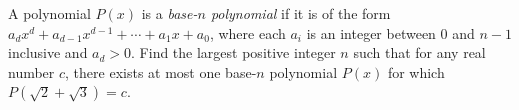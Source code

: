 A polynomial $P(x)$ is a \emph{base-$n$ polynomial} if it is of the form $a_dx^d+a_{d-1}x^{d-1}+\cdots + a_1x+a_0$, where each $a_i$ is an integer between $0$ and $n-1$ inclusive and $a_d>0$. Find the largest positive integer $n$ such that for any real number $c$, there exists at most one base-$n$ polynomial $P(x)$ for which $P(\sqrt 2+\sqrt 3)=c$.

